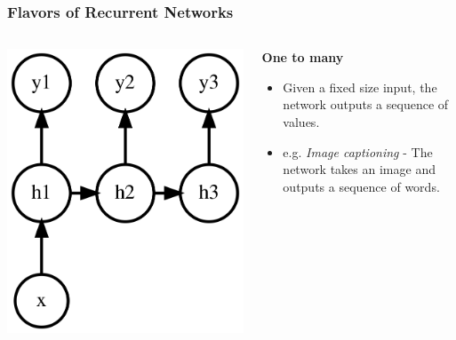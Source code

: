 \documentclass{beamer}
\begin{document}
\begin{frame}[allowframebreaks]
  \frametitle{Flavors of Recurrent Networks \cite{rnn-efectiveness}}
  \begin{columns}
    \begin{column}{0.3\textwidth}
      \begin{center}
        \includegraphics[height=0.5\textheight]{../img/one-to-many.png}
      \end{center}
    \end{column}
    \begin{column}{0.7\textwidth}
      \begin{center}
        \textbf{One to many}
      \end{center}
      \begin{itemize}
        \item Given a fixed size input, the network outputs a sequence of values.
        \item e.g. \textit{Image captioning} - The network takes an image and outputs a sequence of words.
      \end{itemize}
    \end{column}

\end{columns}
\end{frame}
\end{document}
